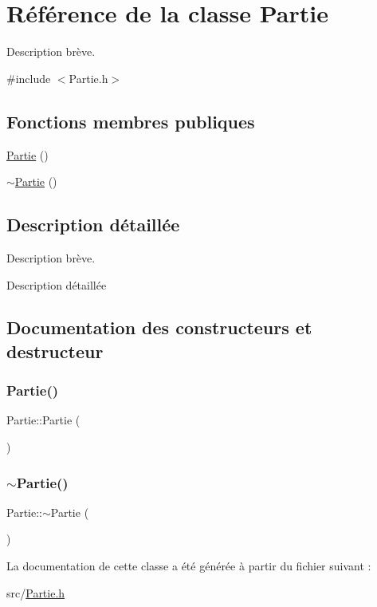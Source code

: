 \hypertarget{class_partie}{}\section{Référence de la classe Partie}
\label{class_partie}


Description brève.  




{\ttfamily \#include $<$Partie.\+h$>$}

\subsection*{Fonctions membres publiques}
\begin{DoxyCompactItemize}
\item 
\hyperlink{class_partie_ae40831aad10fc4a391295e2ea1447b5a}{Partie} ()
\item 
\hyperlink{class_partie_ae4afeb7336bb84427272cfb7018b5e3d}{$\sim$\+Partie} ()
\end{DoxyCompactItemize}


\subsection{Description détaillée}
Description brève. 

Description détaillée 

\subsection{Documentation des constructeurs et destructeur}
\mbox{\label{class_partie_ae40831aad10fc4a391295e2ea1447b5a}} 
\subsubsection{\texorpdfstring{Partie()}{Partie()}}
{\footnotesize\ttfamily Partie\+::\+Partie (\begin{DoxyParamCaption}{ }\end{DoxyParamCaption})}

\mbox{\label{class_partie_ae4afeb7336bb84427272cfb7018b5e3d}} 
\subsubsection{\texorpdfstring{$\sim$\+Partie()}{~Partie()}}
{\footnotesize\ttfamily Partie\+::$\sim$\+Partie (\begin{DoxyParamCaption}{ }\end{DoxyParamCaption})}



La documentation de cette classe a été générée à partir du fichier suivant \+:\begin{DoxyCompactItemize}
\item 
src/\hyperlink{_partie_8h}{Partie.\+h}\end{DoxyCompactItemize}
